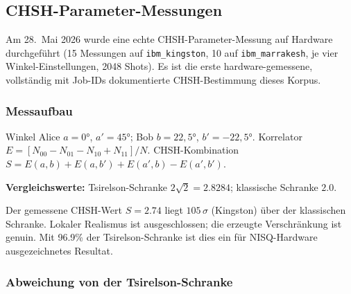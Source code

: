 \subsection{CHSH-Parameter-Messungen}

Am 28.~Mai 2026 wurde eine echte CHSH-Parameter-Messung auf Hardware durchgeführt (15 Messungen auf \texttt{ibm\_kingston}, 10 auf \texttt{ibm\_marrakesh}, je vier Winkel-Einstellungen, 2048 Shots). Es ist die erste hardware-gemessene, vollständig mit Job-IDs dokumentierte CHSH-Bestimmung dieses Korpus.

\subsubsection{Messaufbau}

Winkel Alice $a=0°$, $a'=45°$; Bob $b=22{,}5°$, $b'=-22{,}5°$. Korrelator $E = [N_{00}-N_{01}-N_{10}+N_{11}]/N$. CHSH-Kombination $S = E(a,b)+E(a,b')+E(a',b)-E(a',b')$.

\begin{table}[h]
	\centering
	\caption{CHSH-Messung: Hardware-Ergebnisse (28.~Mai 2026)}
	\label{tab:chsh_real}
\end{table}

\textbf{Vergleichswerte:} Tsirelson-Schranke $2\sqrt{2} = 2.8284$; klassische Schranke $2.0$.

\begin{keyresult}
	Der gemessene CHSH-Wert $S = 2.74$ liegt $105\,\sigma$ (Kingston) über der klassischen Schranke. Lokaler Realismus ist ausgeschlossen; die erzeugte Verschränkung ist genuin. Mit 96.9\% der Tsirelson-Schranke ist dies ein für NISQ-Hardware ausgezeichnetes Resultat.
\end{keyresult}

\subsubsection{Abweichung von der Tsirelson-Schranke}

